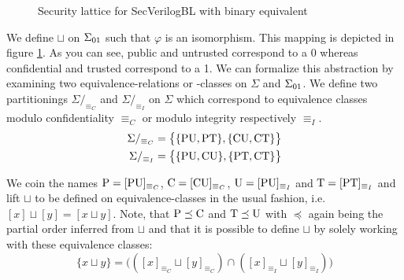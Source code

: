 \begin{figure}
    \centering
    \caption{Security lattice for SecVerilogBL \cite{Ferraiuolo17} with binary equivalent}
    \label{fig:sec-lattice-bin}
\end{figure}

We define $ \sqcup $ on $ \Sigma_{01} $ such that $ \varphi $ is an isomorphism.
This mapping is depicted in figure \ref{fig:sec-lattice-bin}.
As you can see, public and untrusted correspond to a 0 whereas confidential and trusted correspond to a 1.
We can formalize this abstraction by examining two equivalence-relations or -classes on $ \Sigma $ and $ \Sigma_{01} $.
We define two partitionings $ \Sigma/_{\equiv_C} $ and $ \Sigma/_{\equiv_I} $ on $ \Sigma $ which correspond to equivalence classes modulo confidentiality $ \equiv_C $ or modulo integrity respectively $ \equiv_I $.
\begin{align*}
    \Sigma /_{\equiv_C} &= \big\{ \{ \text{PU}, \text{PT} \}, \{ \text{CU}, \text{CT} \} \big\} \\
    \Sigma /_{\equiv_I} &= \big\{ \{ \text{PU}, \text{CU} \}, \{ \text{PT}, \text{CT} \} \big\}
\end{align*}

We coin the names $ \text{P} = [\text{PU}]_{\equiv_C} $, $ \text{C} = [\text{CU}]_{\equiv_C} $, $ \text{U} = [\text{PU}]_{\equiv_I} $ and $ \text{T} = [\text{PT}]_{\equiv_I} $ and lift $ \sqcup $ to be defined on equivalence-classes in the usual fashion, i.e. $ [x] \sqcup [y] = [x \sqcup y] $.
Note, that $ \text{P} \preceq \text{C} $ and $ \text{T} \preceq \text{U} $ with $ \preceq $ again being the partial order inferred from $ \sqcup $ and that it is possible to define $ \sqcup $ by solely working with these equivalence classes:
\begin{equation*}
    \{ x \sqcup y \} = \big(([x]_{\equiv_C} \sqcup [y]_{\equiv_C}) \cap ([x]_{\equiv_I} \sqcup [y]_{\equiv_I}) \big)
\end{equation*}

